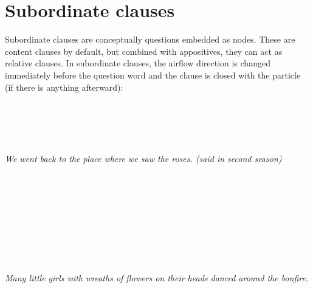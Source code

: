 \documentclass{book}
\begin{document}
\section{Subordinate clauses}

Subordinate clauses are conceptually questions embedded as nodes. These are content clauses by default, but combined with appositives, they can act as relative clauses. In subordinate clauses, the airflow direction is changed immediately before the question word and the clause is closed with the particle  (if there is anything afterward): \\
~\\
 \\
 \\
          \\
~\\
\emph{We went back to the place where we saw the roses. (said in second season)} \\
~\\
 \\
 \\
  \hliii{=}       \hlx{$\lrcorner$} \\
~\\
 \\
 \\
    \\
~\\
\emph{Many little girls with wreaths of flowers on their heads danced around the bonfire.}
\end{document}
